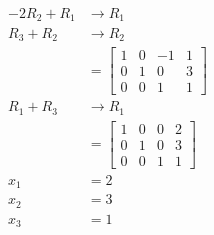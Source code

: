 \documentclass{math}
\begin{document}
\begin{multicols}{2}
\begin{align*}
    -2R_2+R_1 &\to R_1 \\
    R_3+R_2 &\to R_2 \\
    &= \begin{bmatrix}
      1 & 0 & -1 & 1 \\
      0 & 1 & 0 & 3 \\
      0 & 0 & 1 & 1
    \end{bmatrix} \\
    R_1+R_3 &\to R_1 \\
    &= \begin{bmatrix}
      1 & 0 & 0 & 2 \\
      0 & 1 & 0 & 3 \\
      0 & 0 & 1 & 1
    \end{bmatrix} \\
    x_1 &= 2 \\
    x_2 &= 3 \\
    x_3 &= 1
  \end{align*}
\end{multicols}
\end{document}
